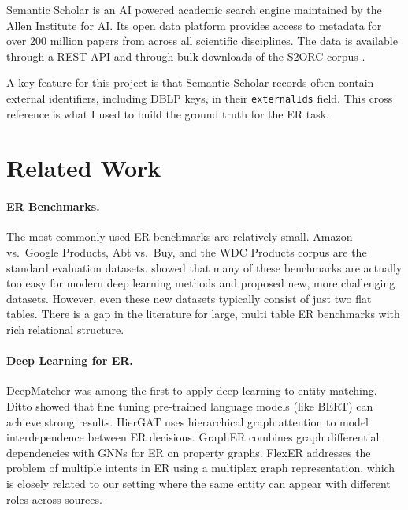 \documentclass{article}
\begin{document}
Semantic Scholar \citep{kinney2023semantic} is an AI powered academic search engine maintained by the Allen Institute for AI.
Its open data platform provides access to metadata for over 200 million papers from across all scientific disciplines.
The data is available through a REST API and through bulk downloads of the S2ORC corpus \citep{lo2020s2orc}.

A key feature for this project is that Semantic Scholar records often contain external identifiers, including DBLP keys, in their \texttt{externalIds} field.
This cross reference is what I used to build the ground truth for the ER task.


\section{Related Work}
\label{sec:related}

\paragraph{ER Benchmarks.}
The most commonly used ER benchmarks are relatively small.
Amazon vs.\ Google Products, Abt vs.\ Buy, and the WDC Products corpus are the standard evaluation datasets.
\citet{primpeli2023critical} showed that many of these benchmarks are actually too easy for modern deep learning methods and proposed new, more challenging datasets.
However, even these new datasets typically consist of just two flat tables.
There is a gap in the literature for large, multi table ER benchmarks with rich relational structure.

\paragraph{Deep Learning for ER.}
DeepMatcher \citep{mudgal2018deepmatcher} was among the first to apply deep learning to entity matching.
Ditto \citep{li2020ditto} showed that fine tuning pre-trained language models (like BERT) can achieve strong results.
HierGAT \citep{yao2022hiergat} uses hierarchical graph attention to model interdependence between ER decisions.
GraphER \citep{loster2021grapher} combines graph differential dependencies with GNNs for ER on property graphs.
FlexER \citep{sagi2022flexer} addresses the problem of multiple intents in ER using a multiplex graph representation, which is closely related to our setting where the same entity can appear with different roles across sources.
\end{document}
